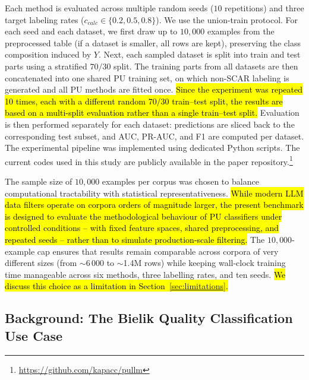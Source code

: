 \documentclass[applsci,article,submit,pdftex,moreauthors]{Definitions/mdpi}
\newcommand{\rev}[1]{\hl{#1}}
\begin{document}
Each method is evaluated across multiple random seeds ($10$ repetitions) and three target labeling rates ($c_{calc} \in \{0.2, 0.5, 0.8\}$). We use the union-train protocol. For each seed and each dataset, we first draw up to $10{,}000$ examples from the preprocessed table (if a dataset is smaller, all rows are kept), preserving the class composition induced by $Y$. Next, each sampled dataset is split into train and test parts using a stratified $70/30$ split. The training parts from all datasets are then concatenated into one shared PU training set, on which non-SCAR labeling is generated and all PU methods are fitted once. \rev{Since the experiment was repeated 10 times, each with a different random 70/30 train--test split, the results are based on a multi-split evaluation rather than a single train--test split.} Evaluation is then performed separately for each dataset: predictions are sliced back to the corresponding test subset, and AUC, PR-AUC, and F1 are computed per dataset. The experimental pipeline was implemented using dedicated Python scripts. The current codes used in this study are publicly available in the paper repository.\footnote{\url{https://github.com/kapacc/pullm}}

The sample size of $10{,}000$ examples per corpus was chosen to balance computational tractability with statistical representativeness. \rev{While modern LLM data filters operate on corpora orders of magnitude larger, the present benchmark is designed to evaluate the methodological behaviour of PU classifiers under controlled conditions -- with fixed feature spaces, shared preprocessing, and repeated seeds -- rather than to simulate production-scale filtering.} The $10{,}000$-example cap ensures that results remain comparable across corpora of very different sizes (from $\sim$6\,000 to $\sim$1.4M rows) while keeping wall-clock training time manageable across six methods, three labelling rates, and ten seeds. \rev{We discuss this choice as a limitation in Section~\ref{sec:limitations}.}

\subsection{Background: The Bielik Quality Classification Use Case}
\end{document}
